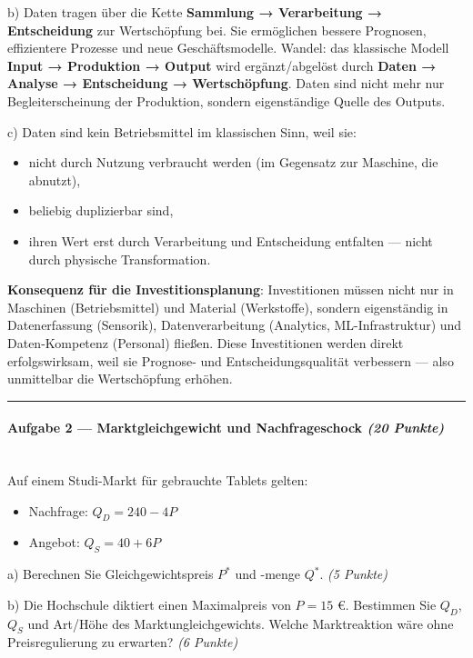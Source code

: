 \documentclass[11pt, a4paper]{article}
\begin{document}
b) Daten tragen über die Kette \textbf{Sammlung → Verarbeitung → Entscheidung} zur Wertschöpfung bei. Sie ermöglichen bessere Prognosen, effizientere Prozesse und neue Geschäftsmodelle. Wandel: das klassische Modell \textbf{Input → Produktion → Output} wird ergänzt/abgelöst durch \textbf{Daten → Analyse → Entscheidung → Wertschöpfung}. Daten sind nicht mehr nur Begleiterscheinung der Produktion, sondern eigenständige Quelle des Outputs.


c) Daten sind kein Betriebsmittel im klassischen Sinn, weil sie:

\begin{itemize}
  \item nicht durch Nutzung verbraucht werden (im Gegensatz zur Maschine, die abnutzt),
  \item beliebig duplizierbar sind,
  \item ihren Wert erst durch Verarbeitung und Entscheidung entfalten — nicht durch physische Transformation.
\end{itemize}

\textbf{Konsequenz für die Investitionsplanung}: Investitionen müssen nicht nur in Maschinen (Betriebsmittel) und Material (Werkstoffe), sondern eigenständig in Datenerfassung (Sensorik), Datenverarbeitung (Analytics, ML-Infrastruktur) und Daten-Kompetenz (Personal) fließen. Diese Investitionen werden direkt erfolgswirksam, weil sie Prognose- und Entscheidungsqualität verbessern — also unmittelbar die Wertschöpfung erhöhen.



\noindent\textcolor{rulegray}{\rule{\linewidth}{0.4pt}}


\paragraph{Aufgabe 2 — Marktgleichgewicht und Nachfrageschock \textit{(20 Punkte)}}\mbox{}\\[2pt]

Auf einem Studi-Markt für gebrauchte Tablets gelten:


\begin{itemize}
  \item Nachfrage: $Q_D = 240 - 4P$
  \item Angebot: $Q_S = 40 + 6P$
\end{itemize}

a) Berechnen Sie Gleichgewichtspreis $P^*$ und -menge $Q^*$. \textit{(5 Punkte)}


b) Die Hochschule diktiert einen Maximalpreis von $P = 15$ €. Bestimmen Sie $Q_D$, $Q_S$ und Art/Höhe des Marktungleichgewichts. Welche Marktreaktion wäre ohne Preisregulierung zu erwarten? \textit{(6 Punkte)}
\end{document}
